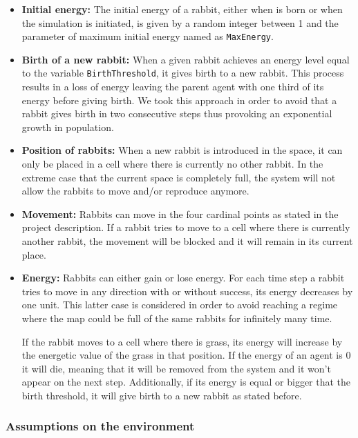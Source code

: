 \documentclass[11pt]{article}
\begin{document}
\begin{itemize}
    \item \textbf{Initial energy: }The initial energy of a rabbit, either when is born or when the simulation is initiated, is given by a random integer between 1 and the parameter of maximum initial energy named as \texttt{MaxEnergy}.
    
    \item \textbf{Birth of a new rabbit: }When a given rabbit achieves an energy level equal to the variable \texttt{BirthThreshold}, it gives birth to a new rabbit. This process results in a loss of energy leaving the parent agent with one third of its energy before giving birth. We took this approach in order to avoid that a rabbit gives birth in two consecutive steps thus provoking an exponential growth in population.
    
    \item \textbf{Position of rabbits: }When a new rabbit is introduced in the space, it can only be placed in a cell where there is currently no other rabbit. In the extreme case that the current space is completely full, the system will not allow the rabbits to move and/or reproduce anymore.
    
    \item \textbf{Movement: }Rabbits can move in the four cardinal points as stated in the project description. If a rabbit tries to move to a cell where there is currently another rabbit, the movement will be blocked and it will remain in its current place. 
    
    \item \textbf{Energy: }Rabbits can either gain or lose energy. For each time step a rabbit tries to move in any direction with or without success, its energy decreases by one unit. This latter case is considered in order to avoid reaching a regime where the map could be full of the same rabbits for infinitely many time.
    
    If the rabbit moves to a cell where there is grass, its energy will increase by the energetic value of the grass in that position. If the energy of an agent is 0 it will die, meaning that it will be removed from the system and it won't appear on the next step. Additionally, if its energy is equal or bigger that the birth threshold, it will give birth to a new rabbit as stated before.
    
\end{itemize}

\subsubsection{Assumptions on the \textbf{environment}}
\end{document}
